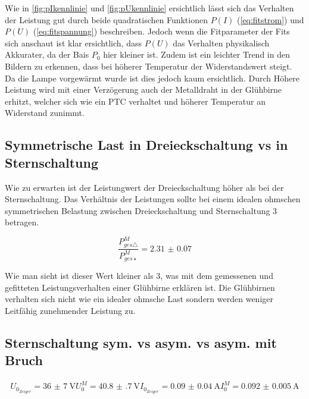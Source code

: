 \documentclass[12pt,english,ngerman]{scrartcl}
\begin{document}
Wie in \autoref{fig:pIkennlinie} und \autoref{fig:pUkennlinie} ersichtlich
lässt sich das Verhalten der Leistung gut durch beide quadratischen Funktionen
$P(I)$ (\autoref{eq:fitstrom}) und $P(U)$ (\autoref{eq:fitspannung})
beschreiben. Jedoch wenn die Fitparameter der Fits sich anschaut ist klar
ersichtlich, dass $P(U)$ das Verhalten physikalisch Akkurater, da der Bais
$P_0$ hier kleiner ist. Zudem ist ein leichter Trend in den Bildern zu
erkennen, dass bei höherer Temperatur der Widerstandswert steigt. Da die Lampe
vorgewärmt wurde ist dies jedoch kaum ersichtlich. Durch Höhere Leistung wird
mit einer Verzögerung auch der Metalldraht in der Glühbirne erhitzt, welcher
sich wie ein PTC verhaltet und höherer Temperatur an Widerstand zunimmt.

\subsection{Symmetrische Last in Dreieckschaltung vs in Sternschaltung}

Wie zu erwarten ist der Leistungwert der Dreieckschaltung höher als bei der
Sternschaltung. Das Verhältnis der Leistungen sollte bei einem idealen ohmschen
symmetrischen Belastung zwischen Dreieckschaltung und Sternschaltung 3
betragen.

\begin{equation}
	\frac{P_{ges\triangle}^M}{P_{ges\star}^M} = \num{2.31(7)}
\end{equation}

Wie man sieht ist dieser Wert kleiner als 3, was mit dem gemessenen und
gefitteten Leistungsverhalten einer Glühbirne erklären ist. Die Glühbirnen
verhalten sich nicht wie ein idealer ohmsche Last sondern werden weniger
Leitfähig zunehmender Leistung zu.

\subsection{Sternschaltung sym. vs asym. vs asym. mit Bruch}
\begin{align}
	U_{0_{Zeiger}} = \SI{36(7)}{\volt}
	U_{0}^M = \SI{40.8(7)}{\volt}
	I_{0_{Zeiger}} = \SI{0.09(4)}{\ampere}
	I_{0}^M = \SI{0.092(5)}{\ampere}
\end{align}
\end{document}
